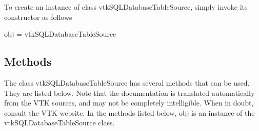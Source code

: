 To create an instance of class vtk\-S\-Q\-L\-Database\-Table\-Source, simply invoke its constructor as follows \begin{DoxyVerb}  obj = vtkSQLDatabaseTableSource
\end{DoxyVerb}
 \hypertarget{vtkwidgets_vtkxyplotwidget_Methods}{}\subsection{Methods}\label{vtkwidgets_vtkxyplotwidget_Methods}
The class vtk\-S\-Q\-L\-Database\-Table\-Source has several methods that can be used. They are listed below. Note that the documentation is translated automatically from the V\-T\-K sources, and may not be completely intelligible. When in doubt, consult the V\-T\-K website. In the methods listed below, {\ttfamily obj} is an instance of the vtk\-S\-Q\-L\-Database\-Table\-Source class. 
